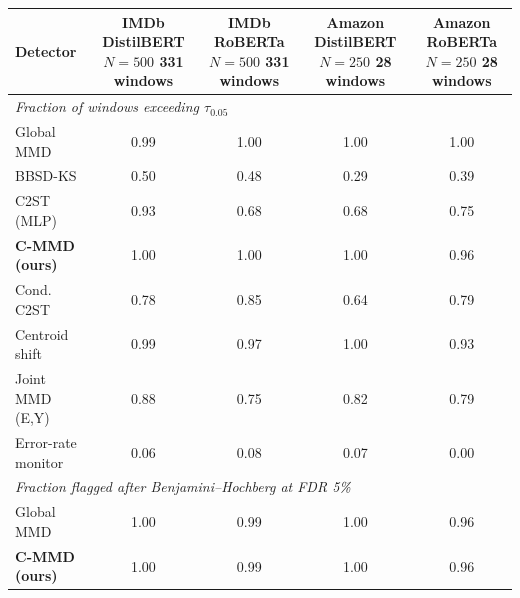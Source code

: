 \setlength{\tabcolsep}{5pt}\renewcommand{\arraystretch}{1.1}%
\begin{tabular}{lcccc}
\toprule
Detector & \makecell{IMDb\\DistilBERT\\$N{=}500$\\331 windows} & \makecell{IMDb\\RoBERTa\\$N{=}500$\\331 windows} & \makecell{Amazon\\DistilBERT\\$N{=}250$\\28 windows} & \makecell{Amazon\\RoBERTa\\$N{=}250$\\28 windows} \\
\midrule
\multicolumn{5}{l}{\textit{Fraction of windows exceeding $\tau_{0.05}$}} \\
Global MMD & 0.99 & 1.00 & 1.00 & 1.00 \\
BBSD-KS & 0.50 & 0.48 & 0.29 & 0.39 \\
C2ST (MLP) & 0.93 & 0.68 & 0.68 & 0.75 \\
\textbf{C-MMD (ours)} & 1.00 & 1.00 & 1.00 & 0.96 \\
Cond. C2ST & 0.78 & 0.85 & 0.64 & 0.79 \\
Centroid shift & 0.99 & 0.97 & 1.00 & 0.93 \\
Joint MMD (E,Y) & 0.88 & 0.75 & 0.82 & 0.79 \\
Error-rate monitor & 0.06 & 0.08 & 0.07 & 0.00 \\
\midrule
\multicolumn{5}{l}{\textit{Fraction flagged after Benjamini--Hochberg at FDR 5\%}} \\
Global MMD & 1.00 & 0.99 & 1.00 & 0.96 \\
\textbf{C-MMD (ours)} & 1.00 & 0.99 & 1.00 & 0.96 \\
\bottomrule
\end{tabular}